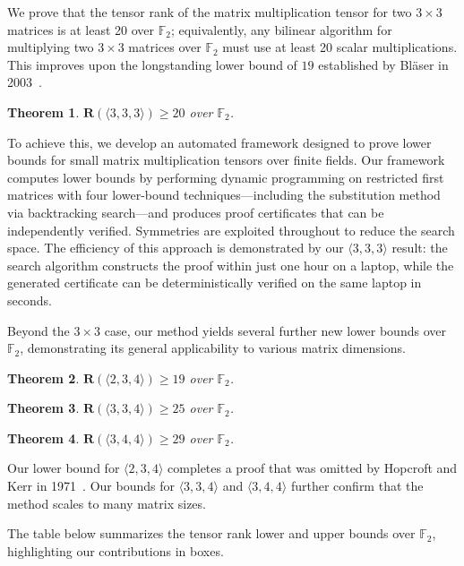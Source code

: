 \documentclass[11pt]{article}
\newtheorem{theorem}{Theorem}
\begin{document}
We prove that the tensor rank of the matrix multiplication tensor for two $3 \times 3$ matrices is at least 20 over $\mathbb{F}_2$; equivalently, any bilinear algorithm for multiplying two $3 \times 3$ matrices over $\mathbb{F}_2$ must use at least 20 scalar multiplications. This improves upon the longstanding lower bound of $19$ established by Bl{\"a}ser in 2003~\cite{blaser2003complexity}.

\begin{theorem}
  $\mathbf{R}(\langle 3,3,3\rangle)\ge 20$ over $\mathbb{F}_2$.
\end{theorem}

To achieve this, we develop an automated framework designed to prove lower bounds for small matrix multiplication tensors over finite fields.
Our framework computes lower bounds by performing dynamic programming on restricted first matrices with four lower-bound techniques—including the substitution method via backtracking search—and produces proof certificates that can be independently verified.
Symmetries are exploited throughout to reduce the search space.
The efficiency of this approach is demonstrated by our $\langle 3,3,3\rangle$ result: the search algorithm constructs the proof within just one hour on a laptop, while the generated certificate can be deterministically verified on the same laptop in seconds.

Beyond the $3\times 3$ case, our method yields several further new lower bounds over $\mathbb{F}_2$, demonstrating its general applicability to various matrix dimensions.

\begin{theorem}
  $\mathbf{R}(\langle 2,3,4\rangle)\ge 19$ over $\mathbb{F}_2$.
\end{theorem}

\begin{theorem}
  $\mathbf{R}(\langle 3,3,4\rangle)\ge 25$ over $\mathbb{F}_2$.
\end{theorem}

\begin{theorem}
  $\mathbf{R}(\langle 3,4,4\rangle)\ge 29$ over $\mathbb{F}_2$.
\end{theorem}

Our lower bound for $\langle 2,3,4\rangle$ completes a proof that was omitted by Hopcroft and Kerr in 1971~\cite{hopcroft1971minimizing}. Our bounds for $\langle 3,3,4\rangle$ and $\langle 3,4,4\rangle$ further confirm that the method scales to many matrix sizes.

The table below summarizes the tensor rank lower and upper bounds over $\mathbb{F}_2$, highlighting our contributions in boxes.
\end{document}
